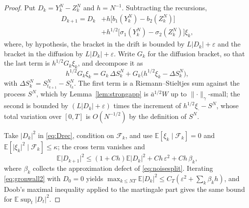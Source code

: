 \documentclass[a4paper,fleqn]{cas-dc}
\theoremstyle{definition}
\newcommand{\E}{\mathbb{E}}
\begin{document}
\begin{proof}
Put $D_{k}=Y^{N}_{k}-Z^{N}_{k}$ and $h=N^{-1}$. Subtracting the recursions,
\begin{equation}
\begin{split}
D_{k+1}=D_{k}&+h\bigl[b_{1}(Y^{N}_{k})-b_{2}(Z^{N}_{k})\bigr]\\
&+h^{1/2}\bigl[\sigma_{1}(Y^{N}_{k})-\sigma_{2}(Z^{N}_{k})\bigr]\xi_{k},
\end{split}
\label{eq:Drec}
\end{equation}
where, by hypothesis, the bracket in the drift is bounded by $L\lvert D_{k}\rvert+\varepsilon$
and the bracket in the diffusion by $L\lvert D_{k}\rvert+\varepsilon$. Write
$G_{k}$ for the diffusion bracket, so that the last term is $h^{1/2}G_{k}\xi_{k}$, and
decompose it as
\begin{equation}
h^{1/2}G_{k}\xi_{k}
=G_{k}\,\Delta S^{N}_{k}+G_{k}\bigl(h^{1/2}\xi_{k}-\Delta S^{N}_{k}\bigr),
\label{eq:noisesplit}
\end{equation}
with $\Delta S^{N}_{k}=S^{N}_{t_{k+1}}-S^{N}_{t_{k}}$.
The first term is a Riemann--Stieltjes sum against the process $S^{N}$, which by
Lemma~\ref{lem:strongapp} is $\bar a^{1/2}W$ up to $\lVert\cdot\rVert_{\gamma}$-small; the
second is bounded by $(L\lvert D_{k}\rvert+\varepsilon)$ times the increment of
$h^{1/2}\xi_{\cdot}-S^{N}$, whose total variation over $[0,T]$ is $O(N^{-1/2})$ by the
definition of $S^{N}$.

Take $\lvert D_{k}\rvert^{2}$ in \eqref{eq:Drec}, condition on $\mathcal{F}_{k}$, and
use $\E[\xi_{k}\mid\mathcal{F}_{k}]=0$ and
$\E[\lvert\xi_{k}\rvert^{2}\mid\mathcal{F}_{k}]\le\kappa$; the cross term vanishes and
\begin{equation}
\E\lvert D_{k+1}\rvert^{2}\le(1+Ch)\E\lvert D_{k}\rvert^{2}+Ch\,\varepsilon^{2}
+C h\,\beta_{k},
\label{eq:gronwall2}
\end{equation}
where $\beta_{k}$ collects the approximation defect of \eqref{eq:noisesplit}. Iterating
\eqref{eq:gronwall2} with $D_{0}=0$ yields
$\max_{k\le NT}\E\lvert D_{k}\rvert^{2}\le C_{T}(\varepsilon^{2}+\sum_{k}\beta_{k}h)$,
and Doob's maximal inequality applied to the martingale part gives the same bound for
$\E\sup_{t}\lvert D_{t}\rvert^{2}$.


\end{proof}
\end{document}
